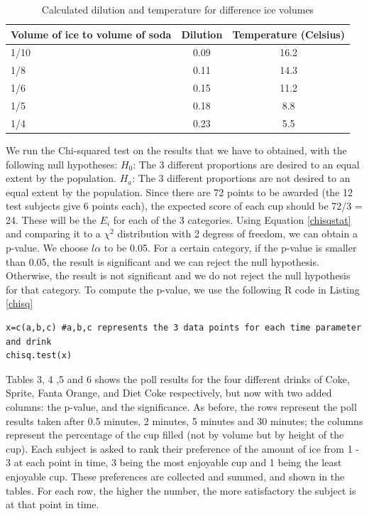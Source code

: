 \documentclass[oneside,12pt]{report}
\begin{document}
\begin{table}[ h]
\centering
\begin{tabular}{ l || c|c}
 Volume of ice to volume of soda &Dilution &Temperature (Celsius) \\
\hline  
1/10 & 0.09&16.2\\ 
\hline  
1/8 & 0.11&14.3\\ 
\hline 
1/6 & 0.15&11.2\\ 
\hline 
1/5 & 0.18&8.8\\ 
\hline 
1/4 & 0.23&5.5\\ 
\hline    
\end{tabular}
\caption{Calculated dilution and temperature for difference ice volumes}
\end{table}

\newpage

We run the Chi-squared test on the results that we have to obtained, with the following null hypotheses:
\vskip6pt $H_0$: The 3 different proportions are desired to an equal extent by the population.
\vskip3pt $H_a$: The 3 different proportions are not desired to an equal extent by the population.
\vskip6pt
\vspace{12pt}
Since there are 72 points to be awarded (the 12 test subjects give 6 points each), the expected score of each cup should be 72/3 = 24. These will be the $E_i$ for each of the 3 categories. Using Equation \eqref{chisqstat} and comparing it to a $\chi^2$ distribution with 2 degress of freedom, we can obtain a p-value. We choose $l\alpha$ to be 0.05. For a certain category, if the p-value is smaller than 0.05, the result is significant and we can reject the null hypothesis. Otherwise, the result is not significant and we do not reject the null hypothesis for that category.
\vspace{12pt}
\newline
To compute the p-value, we use the following R code in Listing \ref{chisq}
\begin{lstlisting}[caption= R code for chi-squared test, label=chisq]
x=c(a,b,c) #a,b,c represents the 3 data points for each time parameter and drink
chisq.test(x)
\end{lstlisting}
\vspace{12pt}
Tables 3, 4 ,5 and 6 shows the poll results for the four different drinks of Coke, Sprite, Fanta Orange, and Diet Coke respectively, but now with two added columns: the p-value, and the significance. As before, the rows represent the poll results taken after 0.5 minutes, 2 minutes, 5 minutes and 30 minutes; the columns represent the percentage of the cup filled (not by volume but by height of the cup). Each subject is asked to rank their preference of the amount of ice from 1 - 3 at each point in time, 3 being the most enjoyable cup and 1 being the least enjoyable cup. These preferences are collected and summed, and shown in the tables. For each row, the higher the number, the more satisfactory the subject is at that point in time. 
\end{document}
